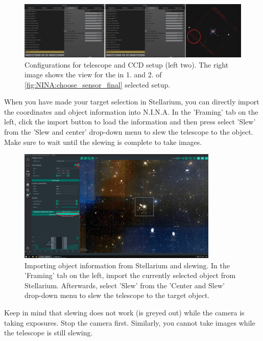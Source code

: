 \documentclass[a4paper, 11pt, fleqn]{memoir}
\begin{document}
\begin{figure}
    \centering
    \includegraphics[width=\textwidth]{figures/NINA/gear_selection_final.png}
    \caption{Configurations for telescope and CCD setup (left two). The right image shows the view for the in 1. and 2. of \ref{fig:NINA:choose_sensor_final} selected setup.}
    \label{fig:NINA:gear_selection_final}
\end{figure}

When you have made your target selection in Stellarium, you can directly import the coordinates and object information into N.I.N.A. In the 'Framing' tab on the left, click the import button to load the information and then press select 'Slew' from the 'Slew and center' drop-down menu to slew the telescope to the object. Make sure to wait until the slewing is complete to take images.

\begin{figure}
    \centering
    \includegraphics[width=0.85\textwidth]{figures/NINA/ImportAndSlew.png}
    \caption{Importing object information from Stellarium and slewing. In the 'Framing' tab on the left, import the currently selected object from Stellarium. Afterwards, select 'Slew' from the 'Center and Slew' drop-down menu to slew the telescope to the target object.}
    \label{fig:NINA:ImportAndSlew}
\end{figure}

Keep in mind that slewing does not work (is greyed out) while the camera is taking exposures. Stop the camera first.
Similarly, you cannot take images while the telescope is still slewing.
\end{document}
